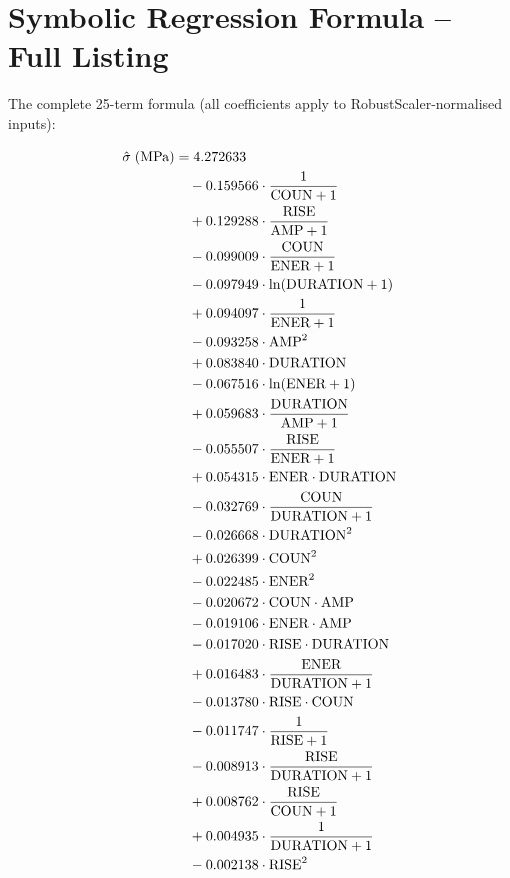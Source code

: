 \documentclass[12pt,a4paper]{article}
\begin{document}
\appendix

\section{Symbolic Regression Formula -- Full Listing}
\label{app:formula}

The complete 25-term formula (all coefficients apply to RobustScaler-normalised
inputs):

\begin{align}
  \hat{\sigma} \;(\text{MPa}) &= 4.272633 \notag\\
  &\quad - 0.159566 \cdot \frac{1}{\text{COUN}+1} \notag\\
  &\quad + 0.129288 \cdot \frac{\text{RISE}}{\text{AMP}+1} \notag\\
  &\quad - 0.099009 \cdot \frac{\text{COUN}}{\text{ENER}+1} \notag\\
  &\quad - 0.097949 \cdot \ln(\text{DURATION}+1) \notag\\
  &\quad + 0.094097 \cdot \frac{1}{\text{ENER}+1} \notag\\
  &\quad - 0.093258 \cdot \text{AMP}^{2} \notag\\
  &\quad + 0.083840 \cdot \text{DURATION} \notag\\
  &\quad - 0.067516 \cdot \ln(\text{ENER}+1) \notag\\
  &\quad + 0.059683 \cdot \frac{\text{DURATION}}{\text{AMP}+1} \notag\\
  &\quad - 0.055507 \cdot \frac{\text{RISE}}{\text{ENER}+1} \notag\\
  &\quad + 0.054315 \cdot \text{ENER} \cdot \text{DURATION} \notag\\
  &\quad - 0.032769 \cdot \frac{\text{COUN}}{\text{DURATION}+1} \notag\\
  &\quad - 0.026668 \cdot \text{DURATION}^{2} \notag\\
  &\quad + 0.026399 \cdot \text{COUN}^{2} \notag\\
  &\quad - 0.022485 \cdot \text{ENER}^{2} \notag\\
  &\quad - 0.020672 \cdot \text{COUN} \cdot \text{AMP} \notag\\
  &\quad - 0.019106 \cdot \text{ENER} \cdot \text{AMP} \notag\\
  &\quad - 0.017020 \cdot \text{RISE} \cdot \text{DURATION} \notag\\
  &\quad + 0.016483 \cdot \frac{\text{ENER}}{\text{DURATION}+1} \notag\\
  &\quad - 0.013780 \cdot \text{RISE} \cdot \text{COUN} \notag\\
  &\quad - 0.011747 \cdot \frac{1}{\text{RISE}+1} \notag\\
  &\quad - 0.008913 \cdot \frac{\text{RISE}}{\text{DURATION}+1} \notag\\
  &\quad + 0.008762 \cdot \frac{\text{RISE}}{\text{COUN}+1} \notag\\
  &\quad + 0.004935 \cdot \frac{1}{\text{DURATION}+1} \notag\\
  &\quad - 0.002138 \cdot \text{RISE}^{2}
  \label{eq:full_formula}
\end{align}
\end{document}
